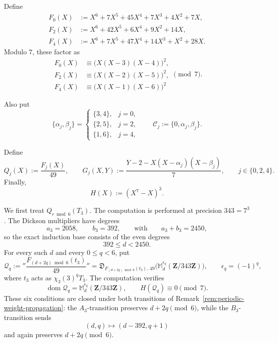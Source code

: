\documentclass[11pt]{article}
\newcommand{\F}{\mathbf F}
\theoremstyle{plain}
\theoremstyle{definition}
\theoremstyle{remark}
\numberwithin{equation}{section}
\begin{document}
Define \begin{equation}\begin{aligned}F_0(X)&:=X^6+7X^5+45X^4+7X^3+4X^2+7X,\\F_2(X)&:=X^6+42X^5+6X^4+9X^2+14X,\\F_4(X)&:=X^6+7X^5+47X^4+14X^3+X^2+28X.\end{aligned}\label{eq:p7-tangent-polynomials}\end{equation} Modulo \(7\), these factor as \begin{equation} \begin{aligned} F_0(X)&\equiv\bigl(X(X-3)(X-4)\bigr)^2,\\F_2(X)&\equiv\bigl(X(X-2)(X-5)\bigr)^2,\\F_4(X)&\equiv\bigl(X(X-1)(X-6)\bigr)^2 \end{aligned}\pmod7.\label{eq:p7-tangent-factorizations}\end{equation}

Also put \[\{\alpha_j,\beta_j\}=\begin{cases}\{3,4\},&j=0,\\ \{2,5\},&j=2,\\ \{1,6\},&j=4, \end{cases}\qquad \mathcal C_j:=\{0,\alpha_j,\beta_j\}. \]

Define \begin{equation} Q_j(X):=\frac{F_j(X)}{49}, \qquad G_j(X,Y):= \frac{Y-2-X(X-\alpha_j)(X-\beta_j)}{7}, \qquad j\in\{0,2,4\}.\label{eq:Q-G-definition} \end{equation} Finally, \[H(X) := (X^7 - X)^3.\]

We first treat \(Q_{r\bmod6}(T_3)\). The computation is performed at precision \(343=7^3\). The Dickson multipliers have degrees \[ a_3=2058,\qquad b_3=392, \qquad\mbox{with}\qquad a_3+b_3=2450,\] so the exact induction base consists of the even degrees \[ 392\leq d<2450. \] For every such \(d\) and every \(0\leq q<6\), put \[ \mathcal Q_q:= ''\frac{F_{(d+2q)\bmod 6}(t_3)}{49}'' = \mathfrak D_{F_{(d+2q)\bmod6}(t_3),\,49} \bigl(\mathbb M_d^{\epsilon_q}(\mathbf Z/343\mathbf Z)\bigr), \qquad \epsilon_q=(-1)^q, \] where \(t_3\) acts as \(\chi_3(3)^qT_3\). The computation \cite[\href{https://github.com/nrustom/hecke-congruences/blob/main/playground_mod_49.ipynb}{\nolinkurl{playground_mod_49.ipynb}}]{RustomHeckeCongruences} verifies \[ \operatorname{dom}\mathcal Q_q =\mathbb M_d^{\epsilon_q}(\mathbf Z/343\mathbf Z), \qquad H(\mathcal Q_q)\equiv0\pmod7. \] These six conditions are closed under both transitions of Remark~\ref{rem:periodic-weight-propagation}: the \(A_3\)-transition preserves \(d+2q\pmod6\), while the \(B_3\)-transition sends \[ (d,q)\longmapsto(d-392,q+1) \] and again preserves \(d+2q\pmod6\).
\end{document}
